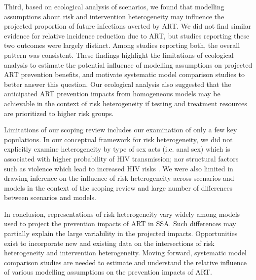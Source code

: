 \par 

Third, based on ecological analysis of scenarios, we found that
modelling assumptions about risk and intervention heterogeneity
may influence the projected proportion of future infections averted by ART.
We did not find similar evidence for relative incidence reduction due to ART,
but studies reporting these two outcomes were largely distinct.
Among studies reporting both, the overall pattern was consistent. %
These findings highlight the limitations of ecological analysis to estimate
the potential influence of modelling assumptions on projected ART prevention benefits,
and motivate systematic model comparison studies to better answer this question. %
Our ecological analysis also suggested that the anticipated ART prevention impacts from homogeneous models
may be achievable in the context of risk heterogeneity
if testing and treatment resources are prioritized to higher risk groups. 

\par %
Limitations of our scoping review includes our examination of only a few key populations.
In our conceptual framework for risk heterogeneity, we did not explicitly examine heterogeneity 
by type of sex acts (i.e. anal sex) which is associated with higher probability of HIV transmission; 
nor structural factors such as violence which lead to increased HIV risks \cite{Silverman2011,Baggaley2013}.
We were also limited in drawing inference on the influence of risk heterogeneity across scenarios and models in the context of the 
scoping review and large number of differences between scenarios and models.

\par
In conclusion, representations of risk heterogeneity vary widely
among models used to project the prevention impacts of ART in SSA.
Such differences may partially explain the large variability in the projected impacts.
Opportunities exist to incorporate new and existing data on
the intersections of risk heterogeneity and intervention heterogeneity.
Moving forward, systematic model comparison studies are needed to
estimate and understand the relative influence of various modelling assumptions on the prevention impacts of ART.
